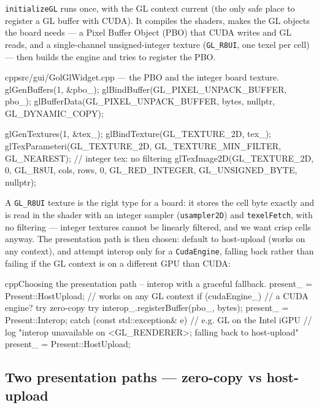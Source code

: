 \documentclass[
	english,
	letterpaper, oneside
]{article}
\begin{document}
\texttt{initializeGL} runs once, with the GL context current (the only safe place
to register a GL buffer with CUDA). It compiles the shaders, makes the GL objects
the board needs --- a Pixel Buffer Object (PBO) that CUDA writes and GL reads,
and a single-channel unsigned-integer texture (\texttt{GL\_R8UI}, one texel per
cell) --- then builds the engine and tries to register the PBO.

\begin{sourcecode}{cpp}{src/gui/GolGlWidget.cpp --- the PBO and the integer board texture.}
glGenBuffers(1, &pbo_);
glBindBuffer(GL_PIXEL_UNPACK_BUFFER, pbo_);
glBufferData(GL_PIXEL_UNPACK_BUFFER, bytes, nullptr, GL_DYNAMIC_COPY);

glGenTextures(1, &tex_);
glBindTexture(GL_TEXTURE_2D, tex_);
glTexParameteri(GL_TEXTURE_2D, GL_TEXTURE_MIN_FILTER, GL_NEAREST); // integer tex: no filtering
glTexImage2D(GL_TEXTURE_2D, 0, GL_R8UI, cols, rows, 0,
             GL_RED_INTEGER, GL_UNSIGNED_BYTE, nullptr);
\end{sourcecode}

A \texttt{GL\_R8UI} texture is the right type for a board: it stores the cell byte
exactly and is read in the shader with an integer sampler (\texttt{usampler2D})
and \texttt{texelFetch}, with no filtering --- integer textures cannot be linearly
filtered, and we want crisp cells anyway. The presentation path is then chosen:
default to host-upload (works on any context), and attempt interop only for a
\texttt{CudaEngine}, falling back rather than failing if the GL context is on a
different GPU than CUDA:

\begin{sourcecode}{cpp}{Choosing the presentation path -- interop with a graceful fallback.}
present_ = Present::HostUpload;               // works on any GL context
if (cudaEngine_) {                            // a CUDA engine? try zero-copy
  try {
    interop_.registerBuffer(pbo_, bytes);
    present_ = Present::Interop;
  } catch (const std::exception& e) {         // e.g. GL on the Intel iGPU
    // log "interop unavailable on <GL_RENDERER>; falling back to host-upload"
    present_ = Present::HostUpload;
  }
}
\end{sourcecode}

\subsection{Two presentation paths --- zero-copy vs host-upload}
\label{sec:gui-paths}
\end{document}
